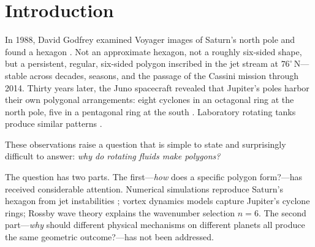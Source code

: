\section{Introduction}
\label{sec:introduction}

In 1988, David Godfrey examined Voyager images of Saturn's north pole and
found a hexagon \citep{Godfrey1988}.  Not an approximate hexagon, not a
roughly six-sided shape, but a persistent, regular, six-sided polygon
inscribed in the jet stream at $76^\circ$\,N---stable across decades,
seasons, and the passage of the Cassini mission through 2014.  Thirty
years later, the Juno spacecraft revealed that Jupiter's poles harbor
their own polygonal arrangements: eight cyclones in an octagonal ring at
the north pole, five in a pentagonal ring at the south
\citep{Adriani2018}.  Laboratory rotating tanks produce similar patterns
\citep{BarbosaAguiar2010}.

These observations raise a question that is simple to state and
surprisingly difficult to answer: \emph{why do rotating fluids make
polygons?}

The question has two parts.  The first---\emph{how} does a specific
polygon form?---has received considerable attention.  Numerical
simulations reproduce Saturn's hexagon from jet instabilities
\citep{Morales2011}; vortex dynamics models capture Jupiter's cyclone
rings; Rossby wave theory explains the wavenumber selection $n = 6$.
The second part---\emph{why} should different physical mechanisms on
different planets all produce the same geometric outcome?---has not
been addressed.


